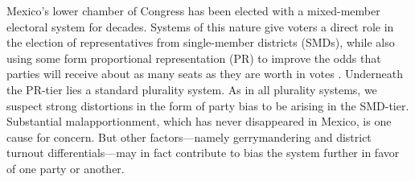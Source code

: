 \documentclass[letter,12pt]{article}
\newcommand{\mc}{\multicolumn}
\begin{document}

\onehalfspacing




\noindent Mexico's lower chamber of Congress has been elected with a mixed-member electoral system for decades. Systems of this nature give voters a direct role in the election of representatives from single-member districts (SMDs), while also using some form proportional representation (PR) to improve the odds that parties will receive about as many seats as they are worth in votes \citep{shugart.wattenbergIntro2001}. Underneath the PR-tier lies a standard plurality system. As in all plurality systems, we suspect strong distortions in the form of party bias to be arising in the SMD-tier. Substantial malapportionment, which has never disappeared in Mexico, is one cause for concern. But other factors---namely gerrymandering and district turnout differentials---may in fact contribute to bias the system further in favor of one party or another.   
\end{document}
